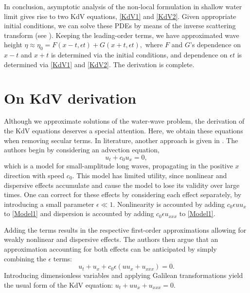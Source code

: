 In conclusion, asymptotic analysis of the non-local formulation in shallow water limit gives rise to two KdV equations, \eqref{KdV1} and \eqref{KdV2}. Given appropriate initial conditions, we can solve these PDEs by means of the inverse scattering transform (see \cite[Chapter 9]{Ablowitz}). Keeping the leading-order terms, we have approximated wave height $\eta \approx \eta_0 = F(x- t, \epsilon t) + G(x + t, \epsilon t),$ where $F$ and $G$'s dependence on $x-t$ and $x+t$ is determined via the initial conditions, and dependence on $\epsilon t$ is determined via \eqref{KdV1} and \eqref{KdV2}. The derivation is complete.

\section{On KdV derivation} %
Although we approximate solutions of the water-wave problem, the derivation of the KdV equations deserves a special attention. Here, we obtain these equations when removing secular terms. In literature, another approach is given in \cite{BBM1972}. The authors begin by considering an advection equation,
\begin{equation}\label{Model1}
u_t + c_0 u_x = 0,
\end{equation} 
which is a model for small-amplitude long waves, propagating in the positive $x$ direction with speed $c_0.$ This model has limited utility, since nonlinear and dispersive effects accumulate and cause the model to lose its validity over large times. One can correct for these effects by considering each effect separately, by introducing a small parameter $\epsilon \ll 1.$ Nonlinearity is accounted by adding $c_0 \epsilon u u_x$ to \eqref{Model1} and dispersion is accounted by adding $c_0 \epsilon u_{xxx}$ to \eqref{Model1}.

Adding the terms results in the respective first-order approximations allowing for weakly nonlinear and dispersive effects.
The authors then argue that an approximation accounting for both effects can be anticipated by simply combining the $\epsilon$ terms:
\begin{equation}\label{Model4}
u_t + u_x + c_0\epsilon(u u_x + u_{xxx}) = 0.
\end{equation}  
Introducing dimensionless variables and applying Galilean transformations yield the usual form of the KdV equation: $u_t +uu_x + u_{xxx} = 0.$


